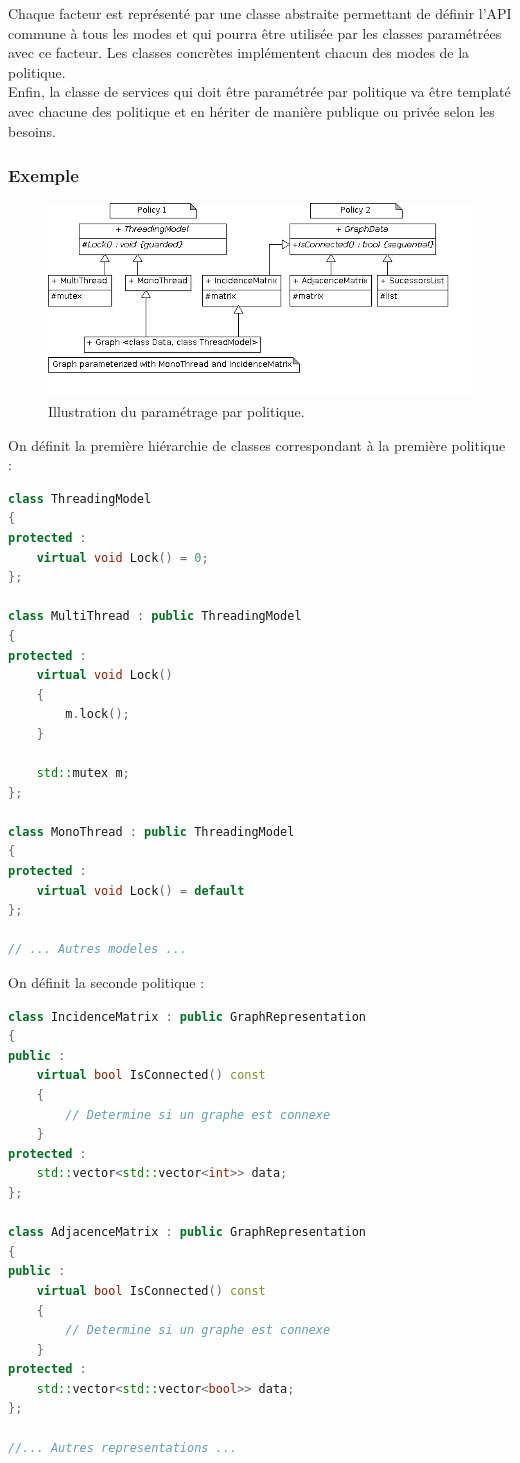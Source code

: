Chaque facteur est représenté par une classe abstraite permettant de définir l'API commune à tous les modes et qui pourra être utilisée par les classes paramétrées avec ce facteur. Les classes concrètes implémentent chacun des modes de la politique.\\
Enfin, la classe de services qui doit être paramétrée par politique va être templaté avec chacune des politique et en hériter de manière publique ou privée selon les besoins.

\subsubsection{Exemple}

\begin{figure}[!h]\centering
    \includegraphics[scale=0.7]{images/policy_illu.png}
    \caption{\label{policy_uml} Illustration du paramétrage par politique.}
\end{figure}

On définit la première hiérarchie de classes correspondant à la première politique :
\begin{lstlisting}[label=policy_1,caption=Définition de la première politique,language=C++]
class ThreadingModel 
{
protected :
    virtual void Lock() = 0;
};

class MultiThread : public ThreadingModel
{
protected :
    virtual void Lock()
    {
        m.lock();
    }
    
    std::mutex m;
};

class MonoThread : public ThreadingModel
{
protected :
    virtual void Lock() = default
};

// ... Autres modeles ...
\end{lstlisting}

On définit la seconde politique :
\begin{lstlisting}[label=policy_2,caption=Définition de la seconde politique,language=C++]
class IncidenceMatrix : public GraphRepresentation
{
public :
    virtual bool IsConnected() const
    {
        // Determine si un graphe est connexe
    }
protected :
    std::vector<std::vector<int>> data;
};

class AdjacenceMatrix : public GraphRepresentation
{
public :
    virtual bool IsConnected() const
    {
        // Determine si un graphe est connexe
    }
protected :
    std::vector<std::vector<bool>> data;
};

//... Autres representations ...
\end{lstlisting}

